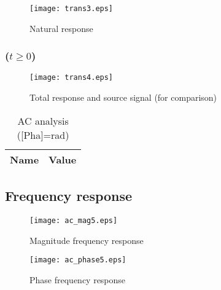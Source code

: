 \begin{figure}[H]
  \centering
  \texttt{[image: trans3.eps]}
  \caption{Natural response}
  \label{fig:nat_sim}
\end{figure}

\subsubsection{($ t \geq 0$)}

\begin{figure}[H]
  \centering
  \texttt{[image: trans4.eps]}
  \caption{Total response and source signal (for comparison)}
  \label{fig:tot:sim}
\end{figure}

\begin{table}[H]
	\centering
	\begin{tabular}{|l|c|}
		\hline    
		    {\bf Name} & {\bf Value} \\
                    \hline
                    \hline
		
	\end{tabular}
	\caption{AC analysis ([Pha]=rad)}
	\label{tab:op1}
\end{table}

\subsection{Frequency response}

\begin{figure}[H]
  \centering
  \texttt{[image: ac\_mag5.eps]}
  \caption{Magnitude frequency response}
  \label{freq_resp_mag_sim}
\end{figure}

\begin{figure}[H]
  \centering
  \texttt{[image: ac\_phase5.eps]}
  \caption{Phase frequency response}
  \label{freq_resp_pha_sim}
\end{figure}
